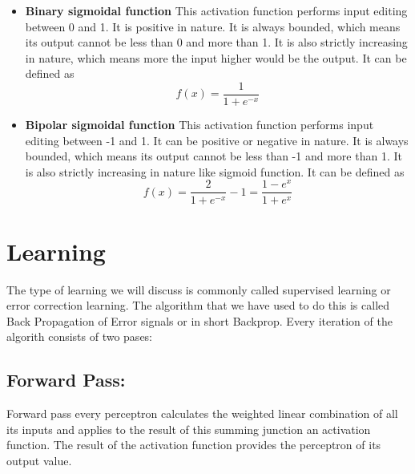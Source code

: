 \documentclass{report}
\begin{document}
\begin{itemize}
\item \textbf{Binary sigmoidal function} This activation function performs input editing between 0 and 1. It is positive in nature. It is always bounded, which means its output cannot be less than 0 and more than 1. It is also strictly increasing in nature, which means more the input higher would be the output. It can be defined as
\[f(x) = \frac{1}{1+e^{-x}}\]

\item \textbf{Bipolar sigmoidal function} This activation function performs input editing between -1 and 1. It can be positive or negative in nature. It is always bounded, which means its output cannot be less than -1 and more than 1. It is also strictly increasing in nature like sigmoid function. It can be defined as\[f(x) = \frac{2}{1+e^{-x}}-1 = \frac{1-e^{x}}{1+e^{x}}\]


\end{itemize}



\section{Learning}
The type of learning we will discuss is commonly called supervised learning or error correction learning. The algorithm that we have used to do this is called Back Propagation of Error signals or in short Backprop. Every iteration of the algorith consists of two pases: 

\subsection{Forward Pass: }
Forward pass every perceptron calculates the weighted linear combination of all its inputs and applies to the result of this summing junction an activation function. The result of the activation function provides the perceptron of its output value.
\end{document}
